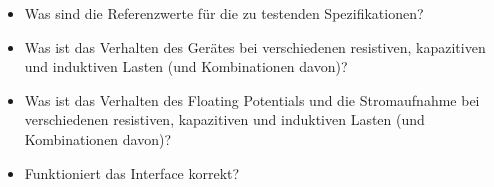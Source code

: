 \begin{itemize}
    \item
        Was sind die Referenzwerte f\"ur die zu testenden Spezifikationen?
    \item
        Was  ist das  Verhalten  des Ger\"ates  bei verschiedenen  resistiven,
        kapazitiven und induktiven Lasten (und Kombinationen davon)?
    \item
        Was ist  das Verhalten des  Floating Potentials und  die Stromaufnahme
        bei verschiedenen  resistiven, kapazitiven und induktiven  Lasten (und
        Kombinationen davon)?
    \item
        Funktioniert das Interface korrekt?
\end{itemize}
